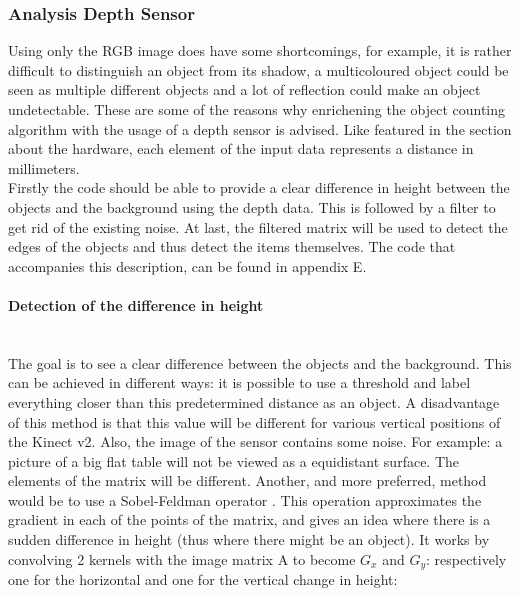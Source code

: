 \documentclass{article}
\begin{document}
\subsubsection{Analysis Depth Sensor}
Using only the RGB image does have some shortcomings, for example, it is rather difficult to distinguish an object from its shadow, a multicoloured object could be seen as multiple different objects and a lot of reflection could make an object undetectable. These are some of the reasons why enrichening the object counting algorithm with the usage of a depth sensor is advised. Like featured in the section about the hardware, each element of the input data represents a distance in millimeters.\\
Firstly the code should be able to provide a clear difference in height between the objects and the background using the depth data. This is followed by a filter to get rid of the existing noise. At last, the filtered matrix will be used to detect the edges of the objects and thus detect the items themselves. The code that accompanies this description, can be found in appendix E.
 
\paragraph{Detection of the difference in height}\mbox{}\\
The goal is to see a clear difference between the objects and the background. This can be achieved in different ways: it is possible to use a threshold and label everything closer than this predetermined distance as an object. A disadvantage of this method is that this value will be different for various vertical positions of the Kinect v2. Also, the image of the sensor contains some noise. For example: a picture of a big flat table will not be viewed as a equidistant surface. The elements of the matrix will be different. Another, and more preferred, method would be to use a Sobel-Feldman operator \cite{Sobel_operator}. This operation approximates the gradient in each of the points of the matrix, and gives an idea where there is a sudden difference in height (thus where there might be an object). It works by convolving 2 kernels with the image matrix A to become $G_{x}$ and $G_{y}$: respectively one for the horizontal and one for the vertical change in height: 
\end{document}
